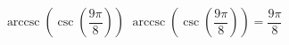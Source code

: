  {$\operatorname{arccsc}\left(\csc\left(\dfrac{9\pi}{8}\right) \right)$ }
{ $\operatorname{arccsc}\left(\csc\left(\dfrac{9\pi}{8}\right) \right) = \dfrac{9\pi}{8}$ }
